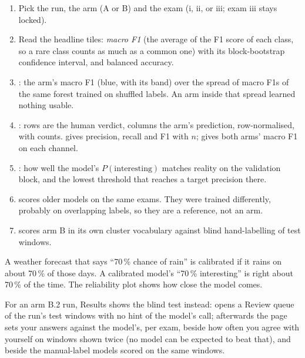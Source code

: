 
\begin{enumerate}
  \item Pick the run, the arm (A or B) and the exam (i, ii, or iii; exam iii stays locked).
  \item Read the headline tiles: \emph{macro F1} (the average of the F1 score of each class, so a
        rare class counts as much as a common one) with its block-bootstrap confidence interval, and
        balanced accuracy.
  \item {}: the arm's macro F1 (blue, with its band) over the spread of macro
        F1s of the same forest trained on shuffled labels. An arm inside that spread learned nothing
        usable.
  \item {}: rows are the human verdict, columns the arm's prediction, row-normalised,
        with counts.  gives precision, recall and F1 with \(n\);  gives
        both arms' macro F1 on each channel.
  \item {}: how well the model's \(P(\text{interesting})\) matches
        reality on the validation block, and the lowest threshold that reaches a target precision
        there.
  \item {} scores older models on the same exams. They were
        trained differently, probably on overlapping labels, so they are a reference, not an arm.
  \item {} scores arm B in its own cluster vocabulary against blind hand-labelling of
        test windows.
\end{enumerate}

\begin{plainterms}[Calibration]
A weather forecast that says ``70\,\% chance of rain'' is calibrated if it rains on about 70\,\% of
those days. A calibrated model's ``70\,\% interesting'' is right about 70\,\% of the time. The
reliability plot shows how close the model comes.
\end{plainterms}

For an arm B.2 run, Results shows the blind test instead:  opens a Review
queue of the run's test windows with no hint of the model's call; afterwards the page sets your answers
against the model's, per exam, beside how often you agree with yourself on windows shown twice (no
model can be expected to beat that), and beside the manual-label models scored on the same windows.

